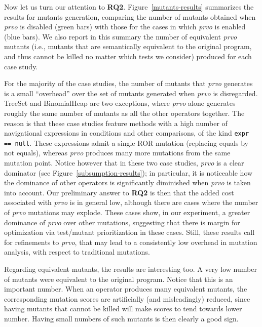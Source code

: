 Now let us turn our attention to \textbf{RQ2}. Figure~\ref{mutants-results} summarizes the results for mutants generation, comparing the number of mutants obtained when \emph{prvo} is disabled (green bars) with those for the cases in which \emph{prvo} is enabled (blue bars). We also report in this summary the number of equivalent \emph{prvo} mutants (i.e., mutants that are semantically equivalent to the original program, and thus cannot be killed no matter which tests we consider) produced for each case study.

For the majority of the case studies, the number of mutants that \emph{prvo} generates is a small ``overhead'' over the set of mutants generated when \emph{prvo} is disregarded. TreeSet and BinomialHeap are two exceptions, where \emph{prvo} alone generates roughly the same number of mutants as all the other operators together. The reason is that these case studies feature methods with a high number of navigational expressions in conditions and other comparisons, of the kind \texttt{expr == null}. These expressions admit a single ROR mutation (replacing equals by not equals), whereas \emph{prvo} produces many more mutations from the same mutation point. Notice however that in these two case studies, \emph{prvo} is a clear dominator (see Figure~\ref{subsumption-results}); in particular, it is noticeable how the dominance of other operators is significantly diminished when \emph{prvo} is taken into account. Our preliminary answer to \textbf{RQ2} is then that the added cost associated with \emph{prvo} is in general low, although there are cases where the number of \emph{prvo} mutations may explode. These cases show, in our experiment, a greater dominance of \emph{prvo} over other mutations, suggesting that there is margin for optimization via test/mutant prioritization in these cases. Still, these results call for refinements to \emph{prvo}, that may lead to a consistently low overhead in mutation analysis, with respect to traditional mutations.

Regarding equivalent mutants, the results are interesting too. A very low number of mutants were equivalent to the original program. Notice that this is an important number. When an operator produces many equivalent mutants, the corresponding mutation scores are artificially (and misleadingly) reduced, since having mutants that cannot be killed will make scores to tend towards lower number. Having small numbers of such mutants is then clearly a good sign.     



